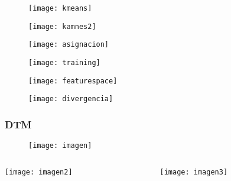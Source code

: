 \documentclass[14pt]{beamer}
\begin{document}
\begin{frame}
  \begin{figure}
    \centering
    \texttt{[image: kmeans]}
  \end{figure}
\end{frame}
\begin{frame}
  \begin{figure}
    \centering
    \texttt{[image: kamnes2]}
  \end{figure}
\end{frame}
\begin{frame}
  \begin{figure}
    \centering
    \texttt{[image: asignacion]}
  \end{figure}
\end{frame}
\begin{frame}
  \begin{figure}
    \centering
    \texttt{[image: training]}
  \end{figure}
\end{frame}
\begin{frame}
  \begin{figure}
    \centering
    \texttt{[image: featurespace]}
  \end{figure}
\end{frame}
\begin{frame}
  \begin{figure}
    \centering
    \texttt{[image: divergencia]}
  \end{figure}
\end{frame}
\begin{frame}
\frametitle{DTM}
  \begin{figure}
    \centering
    \texttt{[image: imagen]}
   \end{figure}
\begin{columns}
		\begin{column}{.49\linewidth}
		 \texttt{[image: imagen2]}
		\end{column}
		\begin{column}{.49\linewidth}
			 \texttt{[image: imagen3]}
		\end{column}
	\end{columns}
\end{frame}
\end{document}
